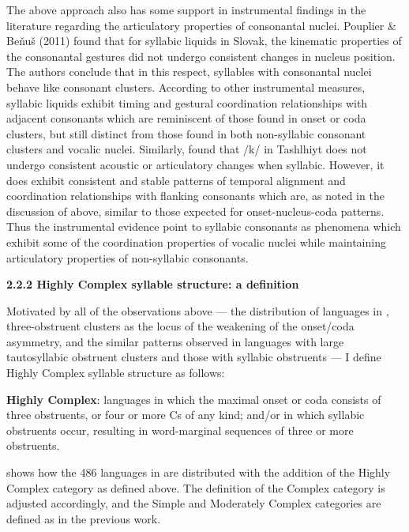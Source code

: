   The above approach also has some support in instrumental findings in the literature regarding the articulatory properties of consonantal nuclei. Pouplier \& Beňuš (2011) found that for syllabic liquids in Slovak, the kinematic properties of the consonantal gestures did not undergo consistent changes in nucleus position. The authors conclude that in this respect, syllables with consonantal nuclei behave like consonant clusters. According to other instrumental measures, syllabic liquids exhibit timing and gestural coordination relationships with adjacent consonants which are reminiscent of those found in onset or coda clusters, but still distinct from those found in both non-syllabic consonant clusters and vocalic nuclei. Similarly, \citet{FougeronRidouane2008} found that /k/ in Tashlhiyt does not undergo consistent acoustic or articulatory changes when syllabic. However, it does exhibit consistent and stable patterns of temporal alignment and coordination relationships with flanking consonants which are, as noted in the discussion of \citet{GoldsteinEtAl2007} above, similar to those expected for onset-nucleus-coda patterns. Thus the instrumental evidence point to syllabic consonants as phenomena which exhibit some of the coordination properties of vocalic nuclei while maintaining articulatory properties of non-syllabic consonants.

\textbf{2.2.2 Highly Complex syllable structure: a definition}

  Motivated by all of the observations above — the distribution of languages in , three-obstruent clusters as the locus of the weakening of the onset/coda asymmetry, and the similar patterns observed in languages with large tautosyllabic obstruent clusters and those with syllabic obstruents — I define Highly Complex syllable structure as follows:

\textbf{Highly Complex}: languages in which the maximal onset or coda consists of three obstruents, or four or more Cs of any kind; and/or in which syllabic obstruents occur, resulting in word-marginal sequences of three or more obstruents.

   shows how the 486 languages in \citet{Maddieson2013a} are distributed with the addition of the Highly Complex category as defined above. The definition of the Complex category is adjusted accordingly, and the Simple and Moderately Complex categories are defined as in the previous work.


